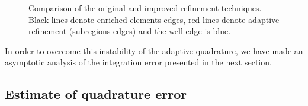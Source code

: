 \documentclass{elsarticle}
\begin{document}
\begin{figure}[!htb]
  \centering    
  \hspace{0pt}
  \caption[Adaptive refinement comparison]
  {Comparison of the original and improved refinement techniques.
   Black lines denote enriched elements edges, red lines denote adaptive refinement (subregions edges) and the well
   edge is blue.
  }
  \label{fig:adapt_refinement}
\end{figure}
In order to overcome this instability of the adaptive quadrature, we have made an asymptotic analysis of the integration error presented 
in the next section.

\subsection{Estimate of quadrature error}
\end{document}
